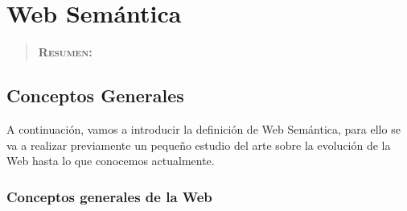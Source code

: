 


\chapter{Web Semántica}
\label{ch:web-semantinca}

\begin{quote}
  {\bf\textsc{Resumen:}} 
\end{quote}

\section{Conceptos Generales}


A continuación, vamos a introducir la definición de Web Semántica, para ello se va a realizar previamente un pequeño estudio del arte sobre la evolución de la Web hasta lo que conocemos actualmente.

\subsection{Conceptos generales de la Web}


